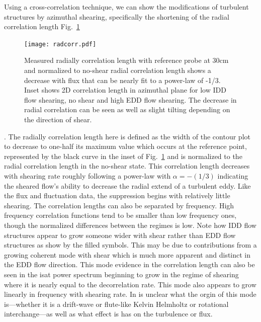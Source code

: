 \documentclass[%
 aps,
 prl,
 amsmath,amssymb,
 reprint,%
]{revtex4-1}
\begin{document}
Using a cross-correlation technique, we can show the modifications of turbulent structures by azimuthal shearing, specifically the shortening of the radial correlation length
Fig.~\ref{fig:radcorr}
\begin{figure}
\begin{center}
\texttt{[image: radcorr.pdf]}%
\end{center}
\caption{\label{fig:radcorr} Measured radially correlation length with reference probe at 30cm and normalized to no-shear radial correlation length shows a decrease with flux that can be nearly fit to a power-law of -1/3. Inset shows 2D correlation length in azimuthal plane for low IDD flow shearing, no shear and high EDD flow shearing. The decrease in radial correlation can be seen as well as slight tilting depending on the direction of shear.}
\end{figure}
. The radially correlation length here is defined as the width of the contour plot to decrease to one-half its maximum value which occurs at the reference point, represented by the black curve in the inset of Fig.~\ref{fig:radcorr} and is normalized to the radial correlation length in the no-shear state. This correlation length decreases with shearing rate roughly following a power-law with $\alpha = -(1/3)$ indicating the sheared flow's ability to decrease the radial extend of a turbulent eddy. Like the flux and fluctuation data, the suppression begins with relatively little shearing. The correlation lengths can also be separated by frequency. High frequency correlation functions tend to be smaller than low frequency ones, though the normalized differences between the regimes is low. Note how IDD flow structures appear to grow someone wider with shear rather than EDD flow structures as show by the filled symbols. This may be due to contributions from a growing coherent mode with shear which is much more apparent and distinct in the EDD flow direction. This mode evidence in the correlation length can also be seen in the isat power spectrum
beginning to grow in the regime of shearing where it is nearly equal to the decorrelation rate. This mode also appears to grow linearly in frequency with shearing rate. In is unclear what the orgin of this mode is---whether it is a drift-wave or flute-like Kelvin Helmholtz or rotational interchange---as well as what effect is has on the turbulence or flux. 
\end{document}
